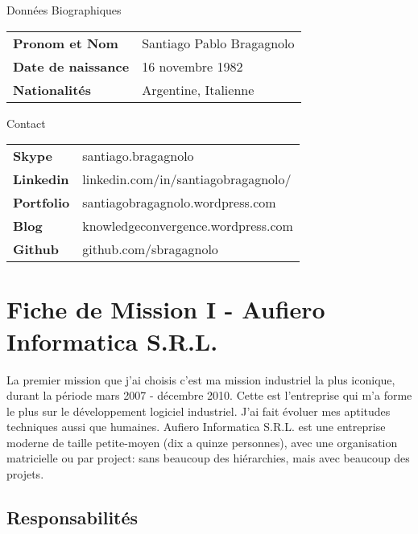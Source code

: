 \documentclass{resume} %
\begin{document}
\begin{rSection}{Donn\'{e}es Biographiques}

\begin{tabular}{ @{} >{\bfseries}l @{\hspace{6ex}} l }
	Pronom et Nom & Santiago Pablo Bragagnolo  \\
	Date de naissance & 16 novembre 1982  \\
	Nationalités & Argentine, Italienne  \\
\end{tabular}

\end{rSection}


\begin{rSection}{Contact}

\begin{tabular}{ @{} >{\bfseries}l @{\hspace{6ex}} l }
	Skype & santiago.bragagnolo  \\
	Linkedin & linkedin.com/in/santiagobragagnolo/  \\
	Portfolio & santiagobragagnolo.wordpress.com  \\
	Blog & knowledgeconvergence.wordpress.com  \\
	Github & github.com/sbragagnolo \\
\end{tabular}

\end{rSection}



\section{Fiche de Mission I - Aufiero Informatica S.R.L.}

	La premier mission que j'ai choisis c'est ma mission industriel la plus iconique, durant la période mars 2007 - décembre 2010. Cette est l'entreprise qui m'a forme le plus sur le développement logiciel industriel. J'ai fait évoluer mes aptitudes techniques aussi que humaines. 
	Aufiero Informatica S.R.L. est une entreprise moderne de taille petite-moyen (dix a quinze personnes), avec une organisation matricielle ou par project: sans beaucoup des hiérarchies, mais avec beaucoup des projets. 
	
	\subsection{Responsabilités}
\end{document}
